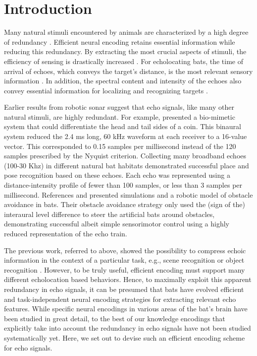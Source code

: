 \documentclass[10pt,letterpaper]{article}
\begin{document}
\linenumbers


\section*{Introduction}

Many natural stimuli encountered by animals are characterized by a high degree of redundancy \cite{Weber2014}. Efficient neural encoding retains essential information while reducing this redundancy. By extracting the most crucial aspects of stimuli, the efficiency of sensing is drastically increased \cite{Warrant2016}. For echolocating bats, the time of arrival of echoes, which conveys the target's distance, is the most relevant sensory information \cite{Griffin1958}. In addition, the spectral content and intensity of the echoes also convey essential information for localizing and recognizing targets \cite{VonHelversen2003,Wotton2000}. 

Earlier results from robotic sonar suggest that echo signals, like many other natural stimuli, are highly redundant. For example,  \cite{Kuc1997} presented a bio-mimetic system that could differentiate the head and tail sides of a coin. This binaural system reduced the 2.4 ms long, 60 kHz waveform at each receiver to a 16-value vector. This corresponded to 0.15 samples per millisecond instead of the 120 samples prescribed by the Nyquist criterion. Collecting many broadband echoes (100-30 Khz) in different natural bat habitats \cite{Vanderelst2016} demonstrated successful place and pose recognition based on these echoes. Each echo was represented using a distance-intensity profile of fewer than 100 samples, or less than 3 samples per millisecond. References \cite{Vanderelst2015a} and \cite{Mansour2019a} presented simulations and a robotic model of obstacle avoidance in bats. Their obstacle avoidance strategy only used the (sign of the) interaural level difference to steer the artificial bats around obstacles, demonstrating successful albeit simple sensorimotor control using a highly reduced representation of the echo train.

The previous work, referred to above, showed the possibility to compress echoic information in the context of a particular task, e.g., scene recognition \cite{Vanderelst2016} or object recognition \cite{Kuc1997,Yovel2008}. However, to be truly useful, efficient encoding must support many different echolocation based behaviors. Hence, to maximally exploit this apparent redundancy in echo signals, it can be presumed that bats have evolved efficient and task-independent neural encoding strategies for extracting relevant echo features. While specific neural encodings in various areas of the bat's brain have been studied in great detail, to the best of our knowledge encodings that explicitly take into account the redundancy in echo signals have not been studied systematically yet. Here, we set out to devise such an efficient encoding scheme for echo signals. 
\end{document}
